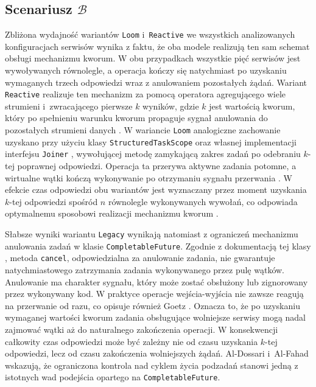 \subsection{Scenariusz \ensuremath{\mathcal{B}}}

Zbliżona wydajność wariantów \texttt{Loom} i~\texttt{Reactive} we wszystkich analizowanych konfiguracjach serwisów wynika z faktu, że oba modele realizują ten sam schemat obsługi mechanizmu kworum. W obu przypadkach wszystkie pięć serwisów jest wywoływanych równolegle, a operacja kończy się natychmiast po uzyskaniu wymaganych trzech odpowiedzi wraz z anulowaniem pozostałych żądań. Wariant \texttt{Reactive} realizuje ten mechanizm za pomocą operatora agregującego wiele strumieni i~zwracającego pierwsze $k$ wyników, gdzie $k$ jest wartością kworum, który po spełnieniu warunku kworum propaguje sygnał anulowania do pozostałych strumieni danych \cite{project-reactor-page}. W wariancie \texttt{Loom} analogiczne zachowanie uzyskano przy użyciu klasy \texttt{StructuredTaskScope} oraz własnej implementacji interfejsu \texttt{Joiner} \cite{java-structured-task-scope}, wywołującej metodę zamykającą zakres zadań po odebraniu $k$-tej poprawnej odpowiedzi. Operacja ta przerywa aktywne zadania potomne, a wirtualne wątki kończą wykonywanie po otrzymaniu sygnału przerwania \cite{jep525}. W efekcie czas odpowiedzi obu wariantów jest wyznaczany przez moment uzyskania $k$-tej odpowiedzi spośród $n$ równolegle wykonywanych wywołań, co odpowiada optymalnemu sposobowi realizacji mechanizmu kworum \cite{veen2024}.

Słabsze wyniki wariantu \texttt{Legacy} wynikają natomiast z ograniczeń mechanizmu anulowania zadań w klasie \texttt{CompletableFuture}. Zgodnie z dokumentacją tej klasy \cite{java-completable-future}, metoda \texttt{cancel}, odpowiedzialna za anulowanie zadania, nie gwarantuje natychmiastowego zatrzymania zadania wykonywanego przez pulę wątków. Anulowanie ma charakter sygnału, który może zostać obsłużony lub zignorowany przez wykonywany kod. W praktyce operacje wejścia-wyjścia nie zawsze reagują na przerwanie od razu, co opisuje również Goetz \cite{goetz2006}. Oznacza to, że po uzyskaniu wymaganej wartości kworum zadania obsługujące wolniejsze serwisy mogą nadal zajmować wątki aż do naturalnego zakończenia operacji. W konsekwencji całkowity czas odpowiedzi może być zależny nie od czasu uzyskania $k$-tej odpowiedzi, lecz od czasu zakończenia wolniejszych żądań. Al-Dossari i~Al-Fahad \cite{dossari2024} wskazują, że ograniczona kontrola nad cyklem życia podzadań stanowi jedną z istotnych wad podejścia opartego na \texttt{CompletableFuture}.

